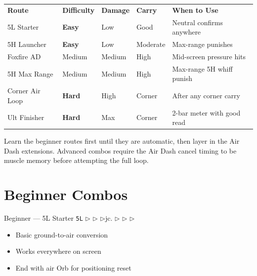 \documentclass[12pt, a4paper]{report}
\newcommand{\faLightbulb}{\ding{72}}
\newcommand{\arrow}{\textbf{\textcolor{ahriGold}{$\triangleright$}}\hspace{0.1em}}
\newcommand{\notation}[1]{{\small\texttt{\textcolor{ahriCyan}{#1}}}}
\newcommand{\advantage}[1]{\textcolor{ahriGreen}{\textbf{#1}}}
\newcommand{\disadvantage}[1]{\textcolor{ahriRed}{\textbf{#1}}}
\begin{document}
\begin{center}
\begin{tabularx}{\linewidth}{C{2.2cm} C{2cm} C{2cm} C{2cm} L{4.6cm}}
\textcolor{ahriCyan}{\textbf{Route}} &
\textcolor{ahriCyan}{\textbf{Difficulty}} &
\textcolor{ahriCyan}{\textbf{Damage}} &
\textcolor{ahriCyan}{\textbf{Carry}} &
\textcolor{ahriCyan}{\textbf{When to Use}} \\
5L Starter & \advantage{Easy} & Low & Good & Neutral confirms anywhere \\
5H Launcher & \advantage{Easy} & Low & Moderate & Max-range punishes \\
Foxfire AD & \textcolor{ahriGold}{Medium} & Medium & High & Mid-screen pressure hits \\
5H Max Range & \textcolor{ahriGold}{Medium} & Medium & High & Max-range 5H whiff punish \\
Corner Air Loop & \disadvantage{Hard} & High & Corner & After any corner carry \\
Ult Finisher & \disadvantage{Hard} & Max & Corner & 2-bar meter with good read \\
\end{tabularx}
\end{center}

\begin{tipbox}[title={\faLightbulb\enspace COMBO LEARNING ORDER}]
Learn the beginner routes first until they are automatic, then layer in the Air Dash extensions. Advanced combos require the Air Dash cancel timing to be muscle memory before attempting the full loop.
\end{tipbox}

\section{Beginner Combos}

\begin{combobox}[]{Beginner --- 5L Starter}
\notation{5L} \arrow \notation{5M} \arrow \notation{5H} \arrow jc. \arrow \notation{j.M} \arrow \notation{j.H} \arrow \notation{j.S1}
\begin{itemize}
  \item Basic ground-to-air conversion
  \item Works everywhere on screen
  \item End with air Orb for positioning reset
\end{itemize}
\end{combobox}
\end{document}

